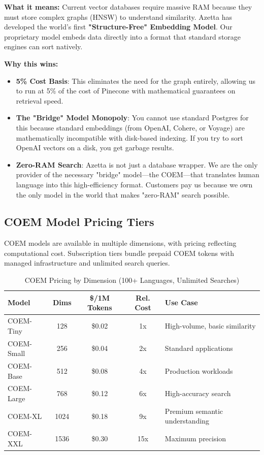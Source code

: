 \textbf{What it means:} Current vector databases require massive RAM because they must store complex graphs (HNSW) to understand similarity. Azetta has developed the world's first \textbf{"Structure-Free" Embedding Model}. Our proprietary model embeds data directly into a format that standard storage engines can sort natively.

\textbf{Why this wins:}
\begin{itemize}[noitemsep]
    \item \textbf{5\% Cost Basis}: This eliminates the need for the graph entirely, allowing us to run at 5\% of the cost of Pinecone with mathematical guarantees on retrieval speed.
    \item \textbf{The "Bridge" Model Monopoly}: You cannot use standard Postgres for this because standard embeddings (from OpenAI, Cohere, or Voyage) are mathematically incompatible with disk-based indexing. If you try to sort OpenAI vectors on a disk, you get garbage results.
    \item \textbf{Zero-RAM Search}: Azetta is not just a database wrapper. We are the only provider of the necessary "bridge" model—the COEM—that translates human language into this high-efficiency format. Customers pay us because we own the only model in the world that makes "zero-RAM" search possible.
\end{itemize}

\subsection{COEM Model Pricing Tiers}
\label{sec:coem-pricing}

COEM models are available in multiple dimensions, with pricing reflecting computational cost. Subscription tiers bundle prepaid COEM tokens with managed infrastructure and unlimited search queries.

\begin{table}[ht]
\centering
\small
\begin{tabular}{|l|c|c|c|p{4cm}|}
\hline
\textbf{Model} & \textbf{Dims} & \textbf{\$/1M Tokens} & \textbf{Rel. Cost} & \textbf{Use Case} \\
\hline
COEM-Tiny & 128 & \$0.02 & 1x & High-volume, basic similarity \\
\hline
COEM-Small & 256 & \$0.04 & 2x & Standard applications \\
\hline
COEM-Base & 512 & \$0.08 & 4x & Production workloads \\
\hline
COEM-Large & 768 & \$0.12 & 6x & High-accuracy search \\
\hline
COEM-XL & 1024 & \$0.18 & 9x & Premium semantic understanding \\
\hline
COEM-XXL & 1536 & \$0.30 & 15x & Maximum precision \\
\hline
\end{tabular}
\caption{COEM Pricing by Dimension (100+ Languages, Unlimited Searches)}
\end{table}

